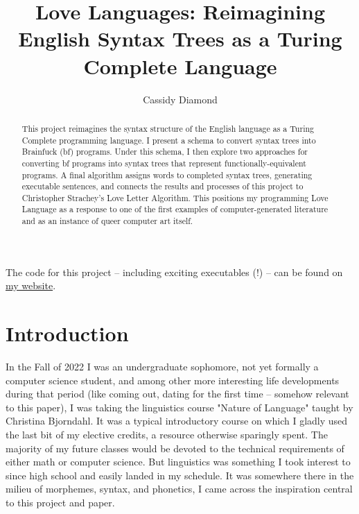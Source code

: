 \documentclass[runningheads]{llncs}
\begin{document}

\title{Love Languages: Reimagining English Syntax Trees as a Turing Complete Language}

\author{
	Cassidy Diamond
}



\maketitle

\begin{abstract}
	This project reimagines the syntax structure of the English language as a Turing Complete programming language. I present a schema to convert syntax trees into Brainfuck (bf) programs. Under this schema, I then explore two approaches for converting bf programs into syntax trees that represent functionally-equivalent programs. A final algorithm assigns words to completed syntax trees, generating executable sentences, and connects the results and processes of this project to Christopher Strachey's Love Letter Algorithm. This positions my programming Love Language as a response to one of the first examples of computer-generated literature and as an instance of queer computer art itself.
\end{abstract}

The code for this project -- including exciting executables (!) -- can be found on \href{https://cassidydiamond.me/love-languages}{my website}.
\section{Introduction}
In the Fall of 2022 I was an undergraduate sophomore, not yet formally a computer science student, and among other more interesting life developments during that period (like coming out, dating for the first time -- somehow relevant to this paper), I was taking the linguistics course "Nature of Language" taught by Christina Bjorndahl. It was a typical introductory course on which I gladly used the last bit of my elective credits, a resource otherwise sparingly spent. The majority of my future classes would be devoted to the technical requirements of either math or computer science. But linguistics was something I took interest to since high school and easily landed in my schedule. It was somewhere there in the milieu of morphemes, syntax, and phonetics, I came across the inspiration central to this project and paper.
\end{document}
